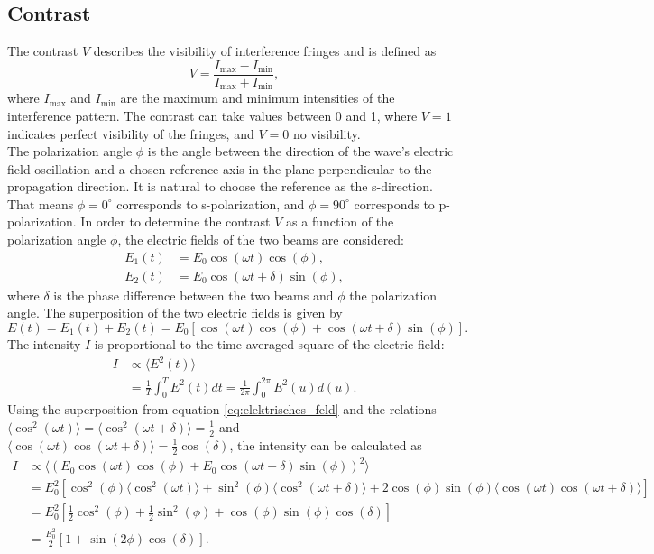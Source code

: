 \subsection{Contrast}
The contrast $V$ describes the visibility of interference fringes and is defined as
\begin{equation}
    V = \frac{I_\text{max} - I_\text{min}}{I_\text{max} + I_\text{min}},
    \label{eq:contrast}
\end{equation}
where $I_\text{max}$ and $I_\text{min}$ are the maximum and minimum intensities of the interference pattern.
The contrast can take values between 0 and 1, where $V = 1$ indicates perfect visibility of the fringes, and $V = 0$ no visibility.\\
The polarization angle $\phi$ is the angle between the direction of the wave's electric field oscillation and a chosen reference axis in the plane perpendicular to the propagation direction.
It is natural to choose the reference as the s-direction. That means $\phi = 0^\circ$ corresponds to s-polarization, and $\phi = 90^\circ$ corresponds to p-polarization.
In order to determine the contrast $V$ as a function of the polarization angle $\phi$, the electric fields of the two beams are considered:
\begin{align}
    E_1(t) &= E_0 \cos(\omega t) \cos(\phi), \\
    E_2(t) &= E_0 \cos(\omega t + \delta) \sin(\phi),
\end{align}
where $\delta$ is the phase difference between the two beams and $\phi$ the polarization angle.
The superposition of the two electric fields is given by
\begin{equation}
    E(t) = E_1(t)+ E_2(t) = E_0 \left[ \cos(\omega t) \cos(\phi) + \cos(\omega t + \delta) \sin(\phi) \right].
    \label{eq:elektrisches_feld}
\end{equation}
The intensity $I$ is proportional to the time-averaged square of the electric field:
\begin{align}
    I &\propto \langle E^2(t) \rangle \nonumber \\
    &= \frac{1}{T}\int_0^{T} E^2(t)  dt = \frac{1}{2\pi}\int_0^{2\pi} E^2(u) d(u).
\end{align}
Using the superposition from equation \eqref{eq:elektrisches_feld} and the relations $\langle \cos^2(\omega t) \rangle = \langle \cos^2(\omega t + \delta) \rangle = \frac{1}{2}$ and $\langle \cos(\omega t) \cos(\omega t + \delta) \rangle = \frac{1}{2} \cos(\delta)$, the intensity can be calculated as
\begin{align}
    I & \propto \langle  (E_0 \cos(\omega t) \cos(\phi) + E_0\cos(\omega t + \delta) \sin(\phi) )^2\rangle \nonumber \\
      & = E_0^2 \left[ \cos^2(\phi) \langle \cos^2(\omega t) \rangle + \sin^2(\phi) \langle \cos^2(\omega t + \delta) \rangle + 2\cos(\phi)\sin(\phi) \langle \cos(\omega t) \cos(\omega t + \delta) \rangle \right] \nonumber \\
      & = E_0^2 \left[ \frac{1}{2} \cos^2(\phi) + \frac{1}{2} \sin^2(\phi) + \cos(\phi)\sin(\phi) \cos(\delta) \right] \nonumber \\
      & = \frac{E_0^2}{2} \left[ 1 + \sin(2\phi) \cos(\delta) \right].
\end{align}
